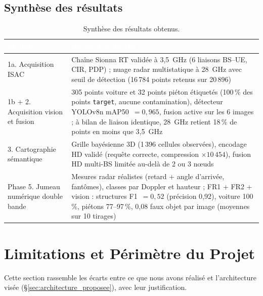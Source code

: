 \documentclass[12pt,a4paper,titlepage]{article}
\newcommand{\hd}[1]{\textcolor{white}{\textbf{#1}}}
\begin{document}
\subsection{Synthèse des résultats}

\begin{table}[H]
    \centering
    \caption{Synthèse des résultats obtenus.}
    \begin{tabularx}{\textwidth}{F{3.8cm}L}
        \toprule
        \hd{Module} & \hd{Résultat principal} \\
        \midrule
        1a. Acquisition ISAC & Chaîne Sionna RT validée à 3,5~GHz (6 liaisons BS--UE, CIR, PDP) ; nuage radar multistatique à 28~GHz avec seuil de détection (16\,784 points retenus sur 20\,896) \\
        1b + 2. Acquisition vision et fusion & 305 points voiture et 32 points piéton étiquetés (100\,\% des points \texttt{target}, aucune contamination), détecteur YOLOv8n mAP50~$=0{,}965$, fusion active sur les 6 images ; à bilan de liaison identique, 28~GHz retient 18\,\% de points en moins que 3,5~GHz \\
        3. Cartographie sémantique & Grille bayésienne 3D (1\,396 cellules observées), encodage HD validé (requête correcte, compression $\times10\,454$), fusion HD multi-BS limitée au-delà de 2 ou 3 n\oe uds \\
        Phase 5. Jumeau numérique double bande & Mesures radar réalistes (retard + angle d'arrivée, fantômes), classes par Doppler et hauteur ; FR1 + FR2 + vision : structures F1~$=0{,}52$ (précision 0,92), voiture 100\,\%, piétons 77--97\,\%, 0,08 faux objet par image (moyennes sur 10 tirages) \\
        \bottomrule
    \end{tabularx}
\end{table}

\section{Limitations et Périmètre du Projet}
\label{sec:limitations}

Cette section rassemble les écarts entre ce que nous avons réalisé et l'architecture visée (\S\ref{sec:architecture_proposee}), avec leur justification.
\end{document}
